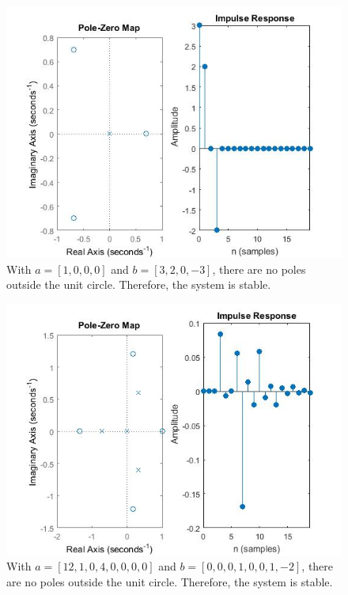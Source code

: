 \documentclass{article}
\begin{document}
\begin{figure}[H]
\includegraphics[scale = .5]{report5_2}
\\ With $a = [1,0,0,0]$ and $b = [3,2,0,-3]$, there are no poles outside the unit circle. Therefore, the system is stable.
\end{figure}

\begin{figure}[H]
\includegraphics[scale = .5]{report5_3}
\\ With $a = [12,1,0,4,0,0,0,0]$ and $b =[0,0,0,1,0,0,1,-2]$, there are no poles outside the unit circle. Therefore, the system is stable.
\end{figure}
\end{document}
